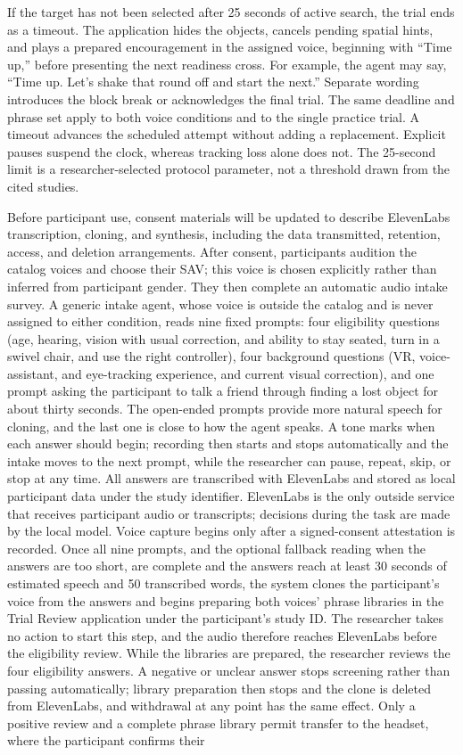 If the target has not been selected after 25 seconds of active search, the trial ends as a timeout. The application hides the objects, cancels pending spatial hints, and plays a prepared encouragement in the assigned voice, beginning with ``Time up,'' before presenting the next readiness cross. For example, the agent may say, ``Time up. Let's shake that round off and start the next.'' Separate wording introduces the block break or acknowledges the final trial. The same deadline and phrase set apply to both voice conditions and to the single practice trial. A timeout advances the scheduled attempt without adding a replacement. Explicit pauses suspend the clock, whereas tracking loss alone does not. The 25-second limit is a researcher-selected protocol parameter, not a threshold drawn from the cited studies.

Before participant use, consent materials will be updated to describe ElevenLabs transcription, cloning, and synthesis, including the data transmitted, retention, access, and deletion arrangements. After consent, participants audition the catalog voices and choose their SAV; this voice is chosen explicitly rather than inferred from participant gender. They then complete an automatic audio intake survey. A generic intake agent, whose voice is outside the catalog and is never assigned to either condition, reads nine fixed prompts: four eligibility questions (age, hearing, vision with usual correction, and ability to stay seated, turn in a swivel chair, and use the right controller), four background questions (VR, voice-assistant, and eye-tracking experience, and current visual correction), and one prompt asking the participant to talk a friend through finding a lost object for about thirty seconds. The open-ended prompts provide more natural speech for cloning, and the last one is close to how the agent speaks. A tone marks when each answer should begin; recording then starts and stops automatically and the intake moves to the next prompt, while the researcher can pause, repeat, skip, or stop at any time. All answers are transcribed with ElevenLabs and stored as local participant data under the study identifier. ElevenLabs is the only outside service that receives participant audio or transcripts; decisions during the task are made by the local model. Voice capture begins only after a signed-consent attestation is recorded. Once all nine prompts, and the optional fallback reading when the answers are too short, are complete and the answers reach at least 30 seconds of estimated speech and 50 transcribed words, the system clones the participant's voice from the answers and begins preparing both voices' phrase libraries in the Trial Review application under the participant's study ID. The researcher takes no action to start this step, and the audio therefore reaches ElevenLabs before the eligibility review. While the libraries are prepared, the researcher reviews the four eligibility answers. A negative or unclear answer stops screening rather than passing automatically; library preparation then stops and the clone is deleted from ElevenLabs, and withdrawal at any point has the same effect. Only a positive review and a complete phrase library permit transfer to the headset, where the participant confirms their 